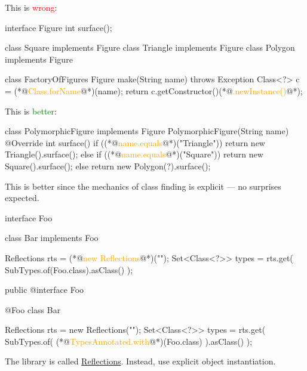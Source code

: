 \documentclass{article}
\begin{document}
\begin{pptWide}{2}
This is \textcolor{red}{wrong}:
\par
{\scriptsize\begin{ffcode}
interface Figure
  int surface();

class Square implements Figure
class Triangle implements Figure
class Polygon implements Figure

class FactoryOfFigures
  Figure make(String name) throws Exception {
    Class<?> c = (*@\textcolor{orange}{Class.forName}@*)(name);
    return c.getConstructor()(*@\textcolor{orange}{.newInstance()}@*);
  }
\end{ffcode}
}
\par\columnbreak\par
This is \textcolor{green}{better}:
\par
{\scriptsize\begin{ffcode}
class PolymorphicFigure implements Figure
  PolymorphicFigure(String name)
  @Override int surface() {
    if ((*@\textcolor{orange}{name.equals}@*)("Triangle")) {
      return new Triangle().surface();
    } else if ((*@\textcolor{orange}{name.equals}@*)("Square")) {
      return new Square().surface();
    } else {
      return new Polygon(?).surface();
    }
  }
\end{ffcode}
}
\par
This is better since the mechanics of class finding is explicit --- no surprises expected.
\end{pptWide}
\plush{}


\begin{pptWide}{2}
{\small\begin{ffcode}
interface Foo {}

class Bar implements Foo {}

Reflections rts =
  (*@\textcolor{orange}{new Reflections}@*)("");
Set<Class<?>> types = rts.get(
  SubTypes.of(Foo.class).asClass()
);
\end{ffcode}
}
\par\columnbreak\par
{\small\begin{ffcode}
public @interface Foo {}

@Foo
class Bar {}

Reflections rts =
  new Reflections("");
Set<Class<?>> types = rts.get(
  SubTypes.of(
    (*@\textcolor{orange}{TypesAnnotated.with}@*)(Foo.class)
  ).asClass()
);
\end{ffcode}
}
\end{pptWide}
\par
The library is called \href{https://github.com/ronmamo/reflections}{Reflections}.
Instead, use explicit object instantiation.
\plush{}
\end{document}
